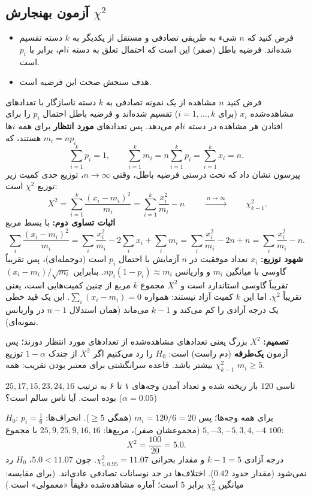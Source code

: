 \subsection{آزمون بهنجارش $\chi^2$ }
\begin{itemize}
\item فرض کنید که $n$ شیء به طریقی تصادفی و مستقل از یکدیگر به $k$ دسته  تقسیم شده‌اند. فرضیه باطل (صفر) این است که احتمال تعلق به دسته $i$ام، برابر با $p_i$ است.
\item هدف سنجش صحت این فرضیه است.
\end{itemize}
فرض کنید $n$ مشاهده از یک نمونه تصادفی به $k$ دسته ناسازگار با تعدادهای مشاهده‌شده $x_i$ (برای $i=1,\ldots,k$) تقسیم شده‌اند و فرضیه باطل احتمال $p_i$ را برای افتادن هر مشاهده در دسته $i$ام می‌دهد. پس تعدادهای \textbf{مورد انتظار} برای همه $i$ها $m_i=np_i$ هستند، که
\[
\sum_{i=1}^kp_i=1,\qquad \sum_{i=1}^km_i=n\sum_{i=1}^kp_i=\sum_{i=1}^kx_i=n .
\]
پیرسون نشان داد که تحت درستی فرضیه باطل، وقتی $n\to\infty$، توزیع حدی کمیت زیر توزیع $\chi^2$ است:
\[
\boxed{\ X^2=\sum_{i=1}^k\frac{(x_i-m_i)^2}{m_i}=\sum_{i=1}^k\frac{x_i^2}{m_i}-n\ }\qquad\xrightarrow{\ n\to\infty\ }\qquad\chi^2_{k-1}.
\]
\textbf{اثبات تساوی دوم:} با بسط مربع
\[
\sum_i\frac{(x_i-m_i)^2}{m_i}=\sum_i\frac{x_i^2}{m_i}-2\sum_ix_i+\sum_im_i=\sum_i\frac{x_i^2}{m_i}-2n+n=\sum_i\frac{x_i^2}{m_i}-n .
\]
\textbf{شهود توزیع:} $x_i$ تعداد موفقیت در $n$ آزمایش با احتمال $p_i$ است (دوجمله‌ای)، پس تقریباً گاوسی با میانگین $m_i$ و واریانس $np_i(1-p_i)\approx m_i$. بنابراین $(x_i-m_i)/\sqrt{m_i}$ تقریباً گاوسی استاندارد است و $X^2$ مجموع $k$ مربع از چنین کمیت‌هایی است، یعنی تقریباً $\chi^2$. اما این $k$ کمیت آزاد نیستند: همواره $\sum_i(x_i-m_i)=0$. این یک قید خطی یک درجه آزادی را کم می‌کند و $k-1$ می‌ماند (همان استدلال $n-1$ در واریانس نمونه‌ای).

\textbf{تصمیم:} $X^2$ بزرگ یعنی تعدادهای مشاهده‌شده از تعدادهای مورد انتظار دورند؛ پس آزمون \textbf{یک‌طرفه} (دم راست) است: $H_0$ را رد می‌کنیم اگر $X^2$ از چندک $1-\alpha$ توزیع $\chi^2_{k-1}$ بیشتر باشد. قاعده سرانگشتی برای معتبر بودن تقریب: همه $m_i\ge5$.

\begin{example}
تاسی $120$ بار ریخته شده و تعداد آمدن وجه‌های ۱ تا ۶ به ترتیب $25,17,15,23,24,16$ بوده است. آیا تاس سالم است؟ ($\alpha=0.05$)
\begin{solution}
$H_0$: $p_i=\frac16$ برای همه وجه‌ها؛ پس $m_i=120/6=20$ (همگی $\ge5$). انحراف‌ها: $5,-3,-5,3,4,-4$ (مجموعشان صفر)، مربع‌ها: $25,9,25,9,16,16$ با مجموع $100$:
\[
X^2=\frac{100}{20}=5.0 .
\]
درجه آزادی $k-1=5$ و مقدار بحرانی $\chi^2_{5,0.95}=11.07$. چون $5.0<11.07$، $H_0$ رد نمی‌شود (مقدار  حدود $0.42$). اختلاف‌ها در حد نوسانات تصادفی عادی‌اند. (برای مقایسه: میانگین $\chi^2_5$ برابر $5$ است؛ آماره مشاهده‌شده دقیقاً «معمولی» است.)
\end{solution}
\end{example}

